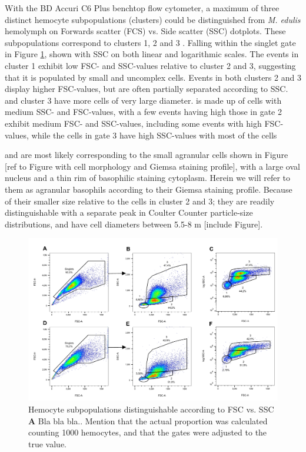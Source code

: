 With the BD Accuri C6 Plus benchtop flow cytometer, a maximum of three distinct hemocyte subpopulations (clusters) could be distinguished from \emph{M. edulis} hemolymph on Forwards scatter (FCS) vs. Side scatter (SSC) dotplots. These subpopulations correspond to clusters 1, 2 and 3 . Falling within the singlet gate in Figure \ref{fig:fsc_vs_ssc}, shown with SSC on both linear and logarithmic scales. The events in cluster 1 exhibit low FSC- and SSC-values relative to cluster 2 and 3, suggesting that it is populated by small and uncomplex cells. Events in both clusters 2 and 3 display higher FSC-values, but are often partially separated according to SSC.  and cluster 3 have more cells of very large diameter. is made up of cells with medium SSC- and FSC-values, with a few events having high those in gate 2 exhibit medium FSC- and SSC-values, including some events with high FSC-values, while the cells in gate 3 have high SSC-values with most of the cells

and are most likely corresponding to the small agranular cells shown in Figure [ref to Figure with cell morphology and Giemsa staining profile], with a large oval nucleus and a thin rim of basophilic staining cytoplasm. Herein we will refer to them as agranular basophils according to their Giemsa staining profile. Because of their smaller size relative to the cells in cluster 2 and 3; they are readily distinguishable with a separate peak in Coulter Counter particle-size distributions, and have cell diameters between 5.5-8 \micro m [include Figure].



\begin{figure}[!ht]
    \centering
    \includegraphics[width=1.0\textwidth]{figures/Gating strategy/lin to log.pdf}
    \caption{Hemocyte subpopulations distinguishable according to FSC vs. SSC \textbf{A} Bla bla bla.. Mention that the actual proportion was calculated counting 1000 hemocytes, and that the gates were adjusted to the true value.}
    \label{fig:fsc_vs_ssc}
\end{figure}

